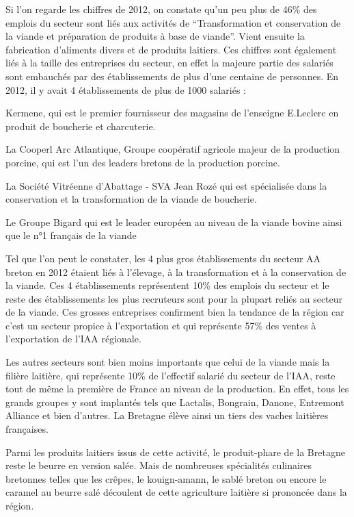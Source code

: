\documentclass[a4paper,12pt]{report}
\begin{document}
			Si l’on regarde les chiffres de 2012, on constate qu’un peu plus de 46\% des emplois du secteur sont liés aux activités de  “Transformation et conservation de la viande et préparation de produits à base de viande”. Vient ensuite la fabrication d’aliments divers et de produits laitiers. Ces chiffres sont également liés à la taille des entreprises du secteur, en effet la majeure partie des salariés sont embauchés par des établissements de plus d’une centaine de personnes. En 2012, il y avait 4 établissements de plus de 1000 salariés :
			\begin{list}{•}{}
			\item Kermene, qui est le premier fournisseur des magasins de l’enseigne E.Leclerc en produit de boucherie et charcuterie.
			\item La Cooperl Arc Atlantique, Groupe coopératif agricole majeur de la production porcine, qui est l’un des leaders bretons de la production porcine.
			\item La Société Vitréenne d’Abattage - SVA Jean Rozé qui est spécialisée dans la conservation et la transformation de la viande de boucherie.
			\item Le Groupe Bigard qui est le leader européen au niveau de la viande bovine ainsi que le n°1 français de la viande\cite{BigardPremierTransformateurViande}
			\end{list}
			
			Tel que l’on peut le constater, les 4 plus gros établissements du secteur AA breton en 2012 étaient liés à l’élevage, à la transformation et à la conservation de la viande. Ces 4 établissements représentent 10\% des emplois du secteur et le reste des établissements les plus recruteurs sont pour la plupart reliés au secteur de la viande. Ces grosses entreprises confirment bien la tendance de la région car c’est un secteur propice à l’exportation et qui représente 57\% des ventes à l’exportation de l’IAA régionale.
			
			Les autres secteurs sont bien moins importants que celui de la viande mais la filière laitière, qui représente 10\% de l’effectif salarié du secteur de l’IAA, reste tout de même la première de France au niveau de la production. En effet, tous les grands groupes y sont implantés tels que Lactalis, Bongrain, Danone, Entremont Alliance et bien d’autres\cite{ProduitsLaitiersRegionBretagne}. La Bretagne élève ainsi un tiers des vaches laitières françaises.
			
			Parmi les produits laitiers issus de cette activité, le produit-phare de la Bretagne reste le beurre en version salée. Mais de nombreuses spécialités culinaires bretonnes telles que les crêpes, le kouign-amann, le sablé breton ou encore le caramel au beurre salé découlent de cette agriculture laitière si prononcée dans la région.
			
\end{document}
